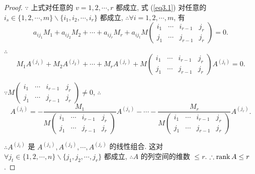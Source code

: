 \documentclass{ctexart}
\begin{document}
\begin{proof}
    $\because$ 上式对任意的 $v=1,2,\cdots,r$ 都成立, 式 (\ref{eq3.1}) 对任意的 $i_s\in\{1,2,\cdots,m\}\backslash\{i_1,i_2,\cdots,i_r\}$ 都成立, $\therefore\forall i=1,2,\cdots,m$, 有
    \[a_{ij_1}M_1+a_{ij_2}M_2+\cdots+a_{ij_r}M_r+a_{ij_t}M\begin{pmatrix}
        i_1 & \cdots & i_{r-1} & j_r \\
        j_1 & \cdots & j_{r-1} & j_r
    \end{pmatrix}=0.\]

    $\therefore$
    \[M_1A^{(j_1)}+M_2A^{(j_2)}+\cdots+M_rA^{(j_r)}+M\begin{pmatrix}
        i_1 & \cdots & i_{r-1} & j_r \\
        j_1 & \cdots & j_{r-1} & j_r
    \end{pmatrix}A^{(j_t)}=0.\]

    $\because M\begin{pmatrix} i_1 & \cdots & i_{r-1} & j_r \\ j_1 & \cdots & j_{r-1} & j_r \end{pmatrix}\neq0$, $\therefore$
    \[A^{(j_t)}=-\dfrac{M_1}{M\begin{pmatrix}
        i_1 & \cdots & i_{r-1} & j_r \\
        j_1 & \cdots & j_{r-1} & j_r
    \end{pmatrix}}A^{(j_1)}-\cdots-\dfrac{M_r}{M\begin{pmatrix}
        i_1 & \cdots & i_{r-1} & j_r \\
        j_1 & \cdots & j_{r-1} & j_r
    \end{pmatrix}}A^{(j_r)}.\]

    $\therefore A^{(j_t)}$ 是 $A^{(j_1)},A^{(j_2)},\cdots,A^{(j_r)}$ 的线性组合. 这对 $\forall j_t\in\{1,2,\cdots,n\}\backslash\{j_1,j_2,\cdots,j_r\}$ 都成立, $\therefore A$ 的列空间的维数 $\leq r$. $\therefore\operatorname{rank} A\leq r$.
\end{proof}
\end{document}
